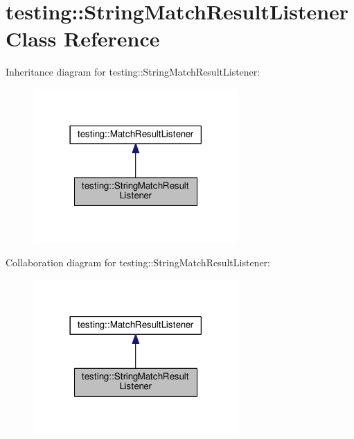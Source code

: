 \hypertarget{classtesting_1_1StringMatchResultListener}{}\section{testing\+:\+:String\+Match\+Result\+Listener Class Reference}
\label{classtesting_1_1StringMatchResultListener}


Inheritance diagram for testing\+:\+:String\+Match\+Result\+Listener\+:\nopagebreak
\begin{figure}[H]
\begin{center}
\leavevmode
\includegraphics[width=222pt]{classtesting_1_1StringMatchResultListener__inherit__graph}
\end{center}
\end{figure}


Collaboration diagram for testing\+:\+:String\+Match\+Result\+Listener\+:\nopagebreak
\begin{figure}[H]
\begin{center}
\leavevmode
\includegraphics[width=222pt]{classtesting_1_1StringMatchResultListener__coll__graph}
\end{center}
\end{figure}
